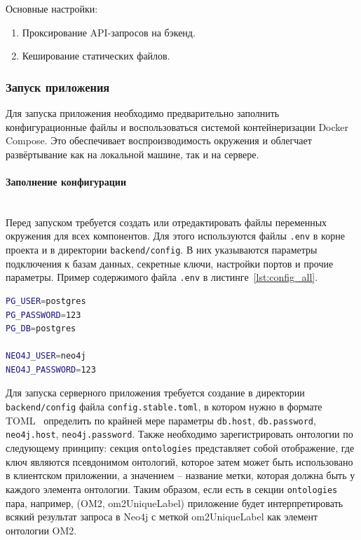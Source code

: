 Основные настройки:
\begin{enumerate}
    \item Проксирование API-запросов на бэкенд.
    \item Кеширование статических файлов.
\end{enumerate}

\subsubsection{Запуск приложения}

Для запуска приложения необходимо предварительно заполнить конфигурационные файлы и воспользоваться системой контейнеризации Docker Compose. Это обеспечивает воспроизводимость окружения и облегчает развёртывание как на локальной машине, так и на сервере.

\paragraph{Заполнение конфигурации} \mbox{}\\

Перед запуском требуется создать или отредактировать файлы переменных окружения для всех компонентов.
Для этого используются файлы \texttt{.env} в корне проекта и в директории \texttt{backend/config}.
В них указываются параметры подключения к базам данных, секретные ключи, настройки портов и прочие параметры.
Пример содержимого файла \texttt{.env} в листинге~\ref{lst:config_all}.
\begin{lstlisting}[frame=single, basicstyle=\footnotesize\ttfamily, label={lst:config_all}, caption={Заполнение конфигурационного файла всего приложения},captionpos=b, breaklines=true, breakatwhitespace=true, language=bash]
PG_USER=postgres
PG_PASSWORD=123
PG_DB=postgres

NEO4J_USER=neo4j
NEO4J_PASSWORD=123
\end{lstlisting}

Для запуска серверного приложения требуется создание в директории \texttt{backend/config} файла \texttt{config.stable.toml}, в котором нужно в формате TOML~\cite{Format:TOML} определить по крайней мере параметры \texttt{db.host}, \texttt{db.password}, \texttt{neo4j.host}, \texttt{neo4j.password}.
Также необходимо зарегистрировать онтологии по следующему принципу: секция \texttt{ontologies} представляет собой отображение, где ключ являются псевдонимом онтологий, которое затем может быть использовано в клиентском приложении, а значением – название метки, которая должна быть у каждого элемента онтологии.
Таким образом, если есть в секции \texttt{ontologies} пара, например, (OM2, om2UniqueLabel) приложение будет интерпретировать всякий результат запроса в Neo4j с меткой om2UniqueLabel как элемент онтологии OM2.

